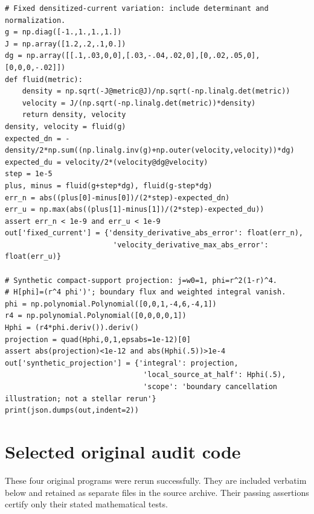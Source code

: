 \documentclass[11pt,oneside]{report}
\begin{document}
\begin{Verbatim}[breaklines=true,breakanywhere=true,fontsize=\scriptsize]
# Fixed densitized-current variation: include determinant and normalization.
g = np.diag([-1.,1.,1.,1.])
J = np.array([1.2,.2,.1,0.])
dg = np.array([[.1,.03,0,0],[.03,-.04,.02,0],[0,.02,.05,0],[0,0,0,-.02]])
def fluid(metric):
    density = np.sqrt(-J@metric@J)/np.sqrt(-np.linalg.det(metric))
    velocity = J/(np.sqrt(-np.linalg.det(metric))*density)
    return density, velocity
density, velocity = fluid(g)
expected_dn = -density/2*np.sum((np.linalg.inv(g)+np.outer(velocity,velocity))*dg)
expected_du = velocity/2*(velocity@dg@velocity)
step = 1e-5
plus, minus = fluid(g+step*dg), fluid(g-step*dg)
err_n = abs((plus[0]-minus[0])/(2*step)-expected_dn)
err_u = np.max(abs((plus[1]-minus[1])/(2*step)-expected_du))
assert err_n < 1e-9 and err_u < 1e-9
out['fixed_current'] = {'density_derivative_abs_error': float(err_n),
                         'velocity_derivative_max_abs_error': float(err_u)}

# Synthetic compact-support projection: j=w0=1, phi=r^2(1-r)^4.
# H[phi]=(r^4 phi')'; boundary flux and weighted integral vanish.
phi = np.polynomial.Polynomial([0,0,1,-4,6,-4,1])
r4 = np.polynomial.Polynomial([0,0,0,0,1])
Hphi = (r4*phi.deriv()).deriv()
projection = quad(Hphi,0,1,epsabs=1e-12)[0]
assert abs(projection)<1e-12 and abs(Hphi(.5))>1e-4
out['synthetic_projection'] = {'integral': projection,
                                'local_source_at_half': Hphi(.5),
                                'scope': 'boundary cancellation illustration; not a stellar rerun'}
print(json.dumps(out,indent=2))
\end{Verbatim}

\chapter{Selected original audit code}
These four original programs were rerun successfully. They are included verbatim below and retained as separate files in the source archive. Their passing assertions certify only their stated mathematical tests.
\end{document}
